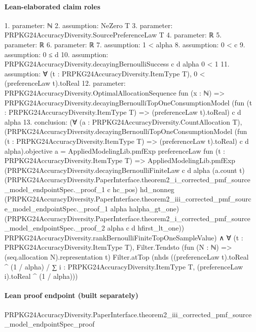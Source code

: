 \documentclass[10pt]{article}
\begin{document}
\paragraph{Lean-elaborated claim roles}\begin{ReviewVerbatim}
1. parameter: ℕ
2. assumption: NeZero T
3. parameter: PRPKG24AccuracyDiversity.SourcePreferenceLaw T
4. parameter: ℝ
5. parameter: ℝ
6. parameter: ℝ
7. assumption: 1 < alpha
8. assumption: 0 < c
9. assumption: 0 ≤ d
10. assumption: PRPKG24AccuracyDiversity.decayingBernoulliSuccess c d alpha 0 < 1
11. assumption: ∀ (t : PRPKG24AccuracyDiversity.ItemType T), 0 < (preferenceLaw t).toReal
12. parameter: PRPKG24AccuracyDiversity.OptimalAllocationSequence fun (x : ℕ) =>
  PRPKG24AccuracyDiversity.decayingBernoulliTopOneConsumptionModel
    (fun (t : PRPKG24AccuracyDiversity.ItemType T) => (preferenceLaw t).toReal) c d alpha
13. conclusion: (∀ (a : PRPKG24AccuracyDiversity.CountAllocation T),
    (PRPKG24AccuracyDiversity.decayingBernoulliTopOneConsumptionModel
            (fun (t : PRPKG24AccuracyDiversity.ItemType T) => (preferenceLaw t).toReal) c d alpha).objective
        a =
      AppliedModelingLib.pmfExp preferenceLaw fun (t : PRPKG24AccuracyDiversity.ItemType T) =>
        AppliedModelingLib.pmfExp
          (PRPKG24AccuracyDiversity.decayingBernoulliFiniteLaw c d alpha (a.count t)
            (PRPKG24AccuracyDiversity.PaperInterface.theorem2_i_corrected_pmf_source_model_endpointSpec._proof_1 c
              hc_pos)
            hd_nonneg
            (PRPKG24AccuracyDiversity.PaperInterface.theorem2_iii_corrected_pmf_source_model_endpointSpec._proof_1 alpha
              halpha_gt_one)
            (PRPKG24AccuracyDiversity.PaperInterface.theorem2_i_corrected_pmf_source_model_endpointSpec._proof_2 alpha c
              d hfirst_lt_one))
          PRPKG24AccuracyDiversity.rankBernoulliFiniteTopOneSampleValue) ∧
  ∀ (t : PRPKG24AccuracyDiversity.ItemType T),
    Filter.Tendsto (fun (N : ℕ) => (seq.allocation N).representation t) Filter.atTop
      (nhds
        ((preferenceLaw t).toReal ^ (1 / alpha) /
          ∑ i : PRPKG24AccuracyDiversity.ItemType T, (preferenceLaw i).toReal ^ (1 / alpha)))
\end{ReviewVerbatim}

\paragraph{Lean proof endpoint (built separately)}\begin{ReviewVerbatim}
PRPKG24AccuracyDiversity.PaperInterface.theorem2_iii_corrected_pmf_source_model_endpointSpec_proof
\end{ReviewVerbatim}
\end{document}
